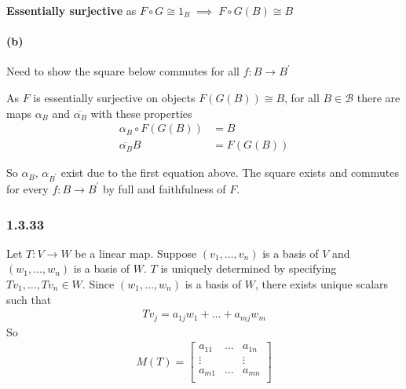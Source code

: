 \documentclass{article}
\begin{document}
\textbf{Essentially surjective} as $F \circ G \cong 1_B \; \implies \; F\circ G(B) \cong B$

\paragraph{(b)}

Need to show the square below commutes for all $f\colon B \rightarrow B^\prime$

\begin{center}
\end{center}

As $F$ is essentially surjective on objects $F(G(B)) \cong B$, for all $B \in \mathcal{B}$ there are maps $\alpha_B$ and $\overline{\alpha_B}$ with these properties
\begin{align*}
  \alpha_B \circ F(G(B)) &= B \\
  \overline{\alpha_B} B &=  F(G(B))
\end{align*}

So $\alpha_B$, $\alpha_{B^\prime}$ exist due to the first equation above. The square exists and commutes for every $f\colon B \rightarrow B^{\prime}$ by full and faithfulness of $F$.

\subsubsection*{1.3.33}

Let $T\colon V \rightarrow W$ be a linear map. Suppose $(v_1,\dots,v_n)$ is a basis of $V$ and $(w_1, \dots, w_n)$ is a basis of $W$.
$T$ is uniquely determined by specifying $Tv_1, \dots, Tv_n \in W$. Since $(w_1, \dots, w_n)$ is a basis of $W$, there exists unique scalars such that
\begin{align*}
 Tv_j = a_{1j}w_1 + \dots + a_{mj}w_m
\end{align*}
So
\begin{align*}
  M(T) =
  \begin{bmatrix}
    a_{11} & \dots & a_{1n} \\
    \vdots &  & \vdots \\
    a_{m1} & \dots & a_{mn} \\
  \end{bmatrix}
\end{align*}
\end{document}
